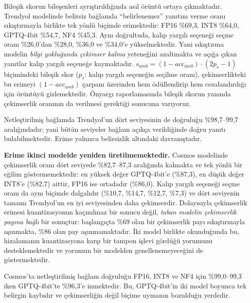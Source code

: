 \documentclass[conference]{IEEEtran}
\begin{document}
Bileşik skorun bileşenleri ayrıştırıldığında asıl örüntü ortaya çıkmaktadır.
Trendyol modelinde belirsiz bağlamda ``belirlenemez'' yanıtını verme oranı
sıkıştırmayla birlikte tek yönlü biçimde erimektedir: FP16 \%69,3, INT8
\%64,0, GPTQ-4bit \%54,7, NF4 \%45,3. Aynı doğrultuda, kalıp yargılı seçeneği
seçme oranı \%26,0'dan \%28,0, \%36,0 ve \%34,0'e yükselmektedir. Yani sıkıştırma modelin
\emph{bilgi yokluğunda çekimser kalma} yeteneğini azaltmakta ve açığa çıkan
yanıtlar kalıp yargılı seçeneğe kaymaktadır. $s_{amb} = (1-acc_{amb}) \cdot
(2p_{s}-1)$ biçimindeki bileşik skor ($p_{s}$: kalıp yargılı seçeneğin
seçilme oranı), çekimserlikteki bu erimeyi
$(1-acc_{amb})$ çarpanı üzerinden hem ödüllendirip hem cezalandırdığı için
örüntüyü gizlemektedir. Önyargı raporlamasında bileşik skorun yanında
çekimserlik oranının da verilmesi gerektiği sonucuna varıyoruz.

Netleştirilmiş bağlamda Trendyol'un dört seviyesinin de doğruluğu
\%98,7--99,7 aralığındadır; yani bütün seviyeler bağlam açıkça verildiğinde
doğru yanıtı bulabilmektedir. Erime yalnızca belirsizlik altındaki
davranıştadır.

\textbf{Erime ikinci modelde yeniden üretilmemektedir.} Cosmos modelinde
çekimserlik oranı dört seviyede \%82,7--87,3 aralığında kalmakta ve tek yönlü
bir eğilim göstermemektedir: en yüksek değer GPTQ-4bit'e (\%87,3), en düşük
değer INT8'e (\%82,7) aittir, FP16 ise ortadadır (\%86,0). Kalıp yargılı
seçeneği seçme oranı da aynı biçimde dalgalıdır (\%10,7, \%14,7, \%12,7,
\%7,3) ve dört seviyenin tamamı Trendyol'un en iyi seviyesinden daha
çekimserdir. Dolayısıyla çekimserlik erimesi kuantizasyonun kaçınılmaz bir
sonucu değil, \emph{taban modelin çekimserlik payına bağlı} bir sonuçtur:
başlangıçta \%69 olan bir çekimserlik payı sıkıştırmayla aşınmakta, \%86
olan pay aşınmamaktadır. İki model birlikte okunduğunda bu, hizalamanın
kuantizasyona karşı bir tampon işlevi gördüğü yorumunu desteklemektedir ve
yorumun bir modelden genellenemeyeceğini de göstermektedir.

Cosmos'ta netleştirilmiş bağlam doğruluğu FP16, INT8 ve NF4 için
\%99,0--99,3 iken GPTQ-4bit'te \%96,3'e inmektedir. Bu, GPTQ-4bit'in iki
model boyunca tek belirgin kaybıdır ve çekimserliğin değil biçime uymanın
bozulduğu yerdedir.
\end{document}
